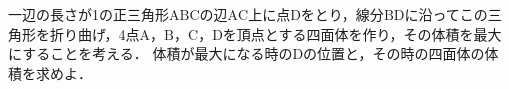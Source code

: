 \documentclass[../../main.tex]{subfiles}
\begin{document}
一辺の長さが1の正三角形$\mathrm{ABC}$の辺$\mathrm{AC}$上に点$\mathrm{D}$をとり，線分$\mathrm{BD}$に沿ってこの三角形を折り曲げ，4点$\mathrm{A}$，$\mathrm{B}$，$\mathrm{C}$，$\mathrm{D}$を頂点とする四面体を作り，その体積を最大にすることを考える．
体積が最大になる時の$\mathrm{D}$の位置と，その時の四面体の体積を求めよ．
\end{document}
